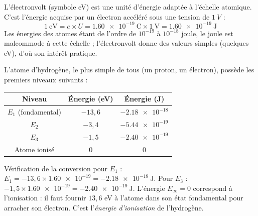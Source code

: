 \documentclass[11pt]{article}
\newcommand{\cle}[1]{{\popxbold\color{popdark}#1}}
\begin{document}
\begin{definition}[L'électronvolt]
L'\cle{électronvolt} (symbole eV) est une unité d'énergie adaptée à l'échelle atomique. C'est l'énergie acquise par un électron accéléré sous une tension de $\SI{1}{V}$ :
\[ 1~\text{eV} = e \times U = \num{1,60e-19}~\text{C} \times 1~\text{V} = \num{1,60e-19}~\text{J} \]
Les énergies des atomes étant de l'ordre de $10^{-19}$ à $10^{-18}$ joule, le joule est malcommode à cette échelle ; l'électronvolt donne des valeurs simples (quelques eV), d'où son intérêt pratique.
\end{definition}

\begin{exemplebox}
L'atome d'hydrogène, le plus simple de tous (un proton, un électron), possède les premiers niveaux suivants :
\begin{center}
\begin{tabular}{|c|c|c|}
\hline
\rowcolor{popblueL} Niveau & Énergie (eV) & Énergie (J) \\
\hline
$E_1$ (fondamental) & $-13,6$ & $-\num{2,18e-18}$ \\
\hline
$E_2$ & $-3,4$ & $-\num{5,44e-19}$ \\
\hline
$E_3$ & $-1,5$ & $-\num{2,40e-19}$ \\
\hline
Atome ionisé & $0$ & $0$ \\
\hline
\end{tabular}
\end{center}
Vérification de la conversion pour $E_1$ : $E_1 = -13,6 \times \num{1,60e-19} = -\num{2,18e-18}~\text{J}$. Pour $E_3$ : $-1,5 \times \num{1,60e-19} = -\num{2,40e-19}~\text{J}$. L'énergie $E_\infty = 0$ correspond à l'ionisation : il faut fournir $13,6$ eV à l'atome dans son état fondamental pour arracher son électron. C'est l'\emph{énergie d'ionisation} de l'hydrogène.
\end{exemplebox}
\end{document}

